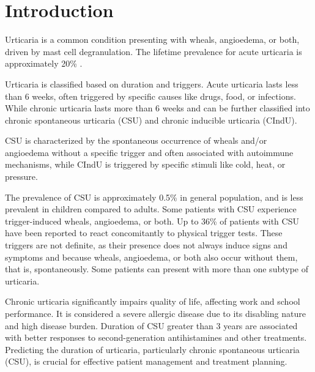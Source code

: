 \documentclass[final,1p,times,authoryear]{elsarticle}
\begin{document}
\sloppy %

\section{Introduction}\label{Introduction}

Urticaria is a common condition presenting with wheals, angioedema, or both, driven by mast cell degranulation\citep{Zuberbier2021The,RadonjicHoesli2018Urticaria,Ring2012Urticaria}. The lifetime prevalence for acute urticaria is approximately 20\% \citep{Zuberbier2021The}. 

Urticaria is classified based on duration and triggers. Acute urticaria lasts less than 6 weeks, often triggered by specific causes like drugs, food, or infections. While chronic urticaria lasts more than 6 weeks and can be further classified into chronic spontaneous urticaria (CSU) and chronic inducible urticaria (CIndU)\citep{Zuberbier2021The,Ring2012Urticaria}. 

CSU is characterized by the spontaneous occurrence of wheals and/or angioedema without a specific trigger and often associated with autoimmune mechanisms\citep{Schettini2023Urticaria}, while CIndU is triggered by specific stimuli like cold, heat, or pressure\citep{Pozderac2020Chronic}. 

The prevalence of CSU is approximately 0.5\% in general population, and is less prevalent in children compared to adults\citep{Balp2015The, Poddighe2019LETTER, Labbene2023Prevalence}. Some patients with CSU experience trigger-induced wheals, angioedema, or both. Up to 36\% of patients with CSU have been reported to react concomitantly to physical trigger tests\citep{Dressler2018Chronic}. These triggers are not definite, as their presence does not always induce signs and symptoms and because wheals, angioedema, or both also occur without them, that is, spontaneously. Some patients can present with more than one subtype of urticaria\citep{Zuberbier2021The}. 

Chronic urticaria significantly impairs quality of life, affecting work and school performance. It is considered a severe allergic disease due to its disabling nature and high disease burden\citep{Zuberbier2021The}. Duration of CSU greater than 3 years are associated with better responses to second-generation antihistamines and other treatments\citep{Chiang2022Predictors}. Predicting the duration of urticaria, particularly chronic spontaneous urticaria (CSU), is crucial for effective patient management and treatment planning. 
\end{document}
